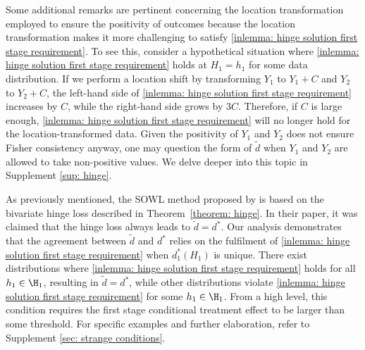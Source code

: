 \documentclass[preprint] {imsart}
\begin{document}
{Some additional remarks are pertinent concerning the location transformation employed to ensure the positivity of outcomes because the location transformation makes it more challenging to satisfy \eqref{inlemma: hinge solution first stage requirement}. To see this, consider a hypothetical situation where \eqref{inlemma: hinge solution first stage requirement} holds at $H_1=h_1$ for some data distribution. If we perform a location shift by transforming $Y_1$ to $Y_1+C$ and $Y_2$ to $Y_2+C$, the left-hand side of \eqref{inlemma: hinge solution first stage requirement} increases by $C$, while the right-hand side grows by $3C$. Therefore, if $C$ is large enough,  \eqref{inlemma: hinge solution first stage requirement}  will 
 no longer hold for the location-transformed data.  Given the positivity of $Y_1$ and $Y_2$ does not ensure Fisher consistency anyway,  one may question the form of $\tilde{d}$  when $Y_1$ and $Y_2$ are allowed to take non-positive values. We delve deeper into this topic  in Supplement \ref{sup: hinge}.





\begin{remark}
 \label{remark: SOWL}
  As previously mentioned, the SOWL method proposed by \cite{zhao2015} is based on  the bivariate hinge loss described in Theorem~\ref{theorem: hinge}. In their paper, it was claimed that the hinge loss always leads to $\tilde{d}=d^*$. Our analysis demonstrates that the agreement between $\tilde{d}$ and $d^*$ relies on the fulfilment of \eqref{inlemma: hinge solution first stage requirement} when $d^*_1(H_1)$ is unique. There exist distributions where \eqref{inlemma: hinge solution first stage requirement} holds for all $h_1\in\H_1$, resulting in  $\tilde{d}=d^*$, while other distributions violate \eqref{inlemma: hinge solution first stage requirement} for some $h_1\in\H_1$. From a high level, this condition requires the first stage conditional treatment effect to be larger than some threshold.  For specific examples and further elaboration, refer to Supplement \ref{sec: strange conditions}.
\end{remark}







}
\end{document}
